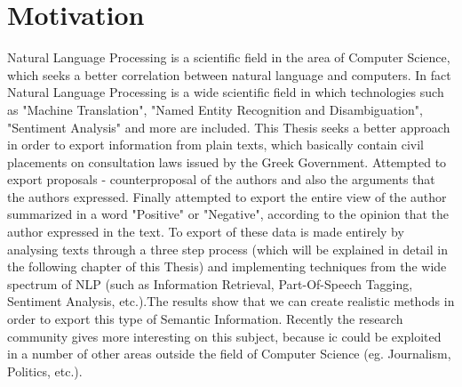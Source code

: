 
\thispagestyle{plain}			%
\setlength{\parskip}{0pt plus 1.0pt}
\section*{Motivation}
Natural Language Processing is a scientific field in the area of Computer Science, which seeks a better correlation between natural language and computers. In fact Natural Language Processing is a wide scientific field in which technologies such as "Machine Translation", "Named Entity Recognition and Disambiguation", "Sentiment Analysis" and more are included. This Thesis seeks a better approach in order to export information from plain texts, which basically contain civil placements on consultation laws issued by the Greek Government. Attempted to export proposals - counterproposal of the authors and also the arguments that the authors expressed. Finally attempted to export the entire view of the author summarized in a word "Positive" or "Negative", according to the opinion that the author expressed in the text. To export of these data is made entirely by analysing texts through a three step process (which will be explained in detail in the following chapter of this Thesis) and implementing techniques from the wide spectrum of NLP (such as Information Retrieval, Part-Of-Speech Tagging, Sentiment Analysis, etc.).The results show that we can create realistic methods in order to export this type of Semantic Information. Recently the research community gives more interesting on this subject, because ic could be exploited in a number of other areas outside the field of Computer Science (eg. Journalism, Politics, etc.).





\vfill

\newpage				%
\thispagestyle{empty}
\mbox{}